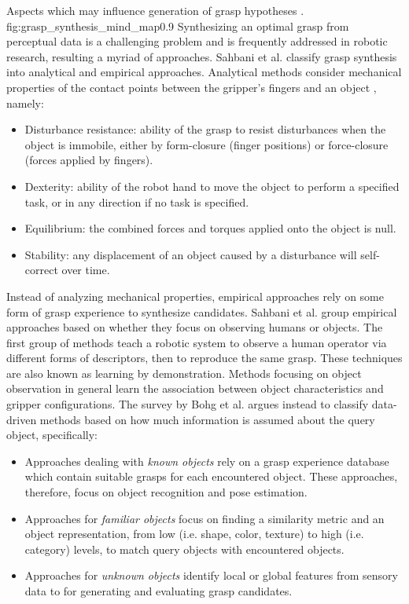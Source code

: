              {Aspects which may influence generation of grasp hypotheses \cite{Bohg2014}.}
             {fig:grasp_synthesis_mind_map}{0.9\textwidth}
Synthesizing an optimal grasp from perceptual data is a challenging problem and is frequently addressed in
robotic research, resulting a myriad of approaches. Sahbani et al. \cite{Sahbani2012} classify grasp synthesis
into analytical and empirical approaches. Analytical methods consider mechanical properties of the contact
points between the gripper's fingers and an object \cite{Roa2015,Sahbani2012,Shimoga1996}, namely:
\begin{itemize}
\item Disturbance resistance: ability of the grasp to resist disturbances when the object is immobile, either by
form-closure (finger positions) or force-closure (forces applied by fingers).
\item Dexterity: ability of the robot hand to move the object to perform a specified task, or in any direction if
no task is specified.
\item Equilibrium: the combined forces and torques applied onto the object is null.
\item Stability: any displacement of an object caused by a disturbance will self-correct over time.
\end{itemize}
Instead of analyzing mechanical properties, empirical approaches rely on some form of grasp experience to synthesize
candidates. Sahbani et al. \cite{Sahbani2012} group empirical approaches based on whether they focus on observing humans
or objects. The first group of methods teach a robotic system to observe a human operator via different forms of
descriptors, then to reproduce the same grasp. These techniques are also known as learning by demonstration.
Methods focusing on object observation in general learn the association between object characteristics and gripper
configurations. The survey by Bohg et al. \cite{Bohg2014} argues instead to classify data-driven methods based on how
much information is assumed about the query object, specifically:
\begin{itemize}
    \item Approaches dealing with \emph{known objects} rely on a grasp experience database which contain suitable grasps
    for each encountered object. These approaches, therefore, focus on object recognition and pose estimation.
    \item Approaches for \emph{familiar objects} focus on finding a similarity metric and an object representation,
    from low (i.e. shape, color, texture) to high (i.e. category) levels, to match query objects with encountered
    objects.
    \item Approaches for \emph{unknown objects} identify local or global features from sensory data to for generating
    and evaluating grasp candidates.
\end{itemize}
